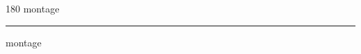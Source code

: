 
\begin{frame}
\begin{center}
\begin{turn}{180}
{\fontsize{2.5cm}{1em}\selectfont montage}
\end{turn}
\vspace{1em}\par  
\hrule
\vspace{1em}\par  
{\fontsize{2.5cm}{1em}\selectfont montage}
\end{center}
\end{frame}
